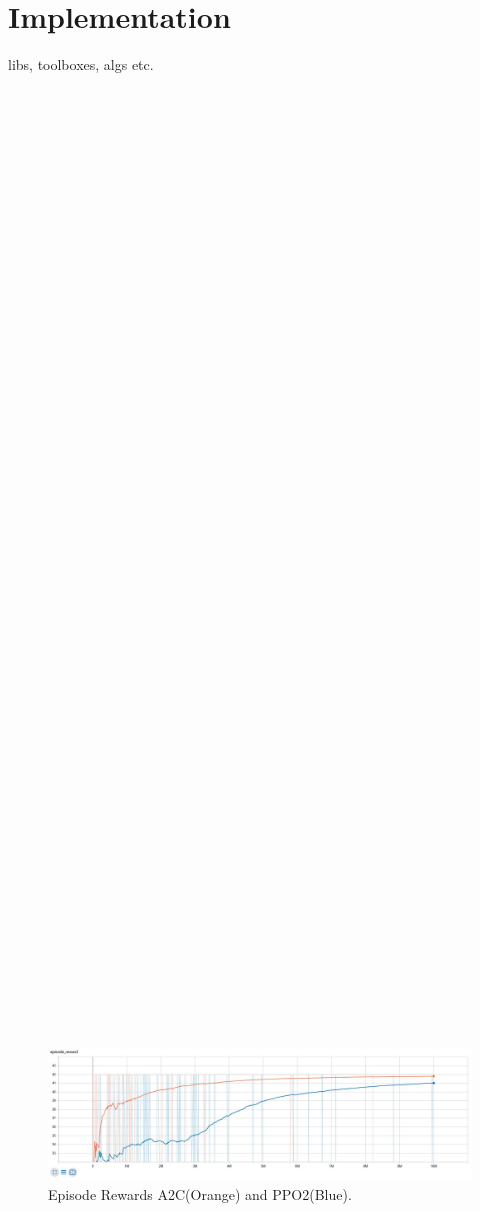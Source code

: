 \documentclass[sigconf]{acmart}
\begin{document}
\section{Implementation}
 libs, toolboxes, algs etc.
\\
\\
\\
\\
\\
\\
\\
\\
\\
\\
\\
\\
\\
\\
\\
\\
\\
\\
\\
\\
\\
\\
\\
\\
\\
\\
\\
\\
\\
\\
\\
\\
\\
\\
\\
\\
\\
\\
\\
\\
\\
\\
\\
\\
\\
\\
\\
\\
\\
\\
\vfill %

\begin{figure}
 \centering
  \includegraphics[width=\textwidth]{episode_reward_big} 
  \caption{Episode Rewards A2C(Orange) and PPO2(Blue).}
  \label{fig:reward1}
\end{figure}
\end{document}
